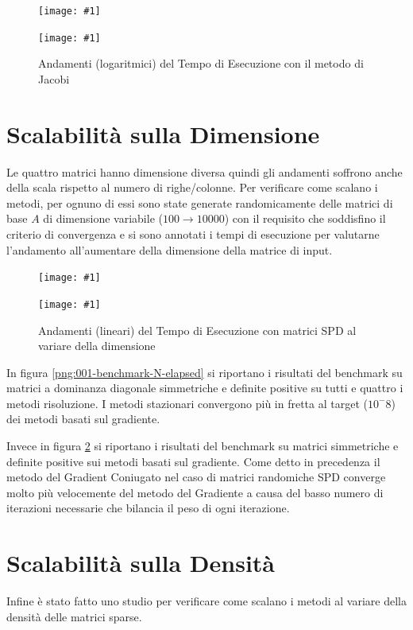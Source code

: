 \documentclass[a4paper,11pt,oneside, table]{article}
\newcommand{\putsubimage}[5] {
  \begin{minipage}{{#4}\linewidth}
	    \centering
      \texttt{[image: \#1]}
	    \caption{#2}\label{#3}
	\end{minipage}
}
\newcommand{\putimagecouple}[2] {
  \begin{figure}[!htb]
      \centering
      #1
      \hspace{0.5cm}
      #2
  \end{figure}
}
\begin{document}
\putimagecouple
  {\putsubimage{./images/te-re-gse.png}{Andamenti (logaritmici) del Tempo di Esecuzione con il metodo di Gauss Seidel}{png:te-re-gse}{0.4}{0.99}}
  {\putsubimage{./images/te-re-jae.png}{Andamenti (logaritmici) del Tempo di Esecuzione con il metodo di Jacobi}{png:te-re-jae}{0.4}{0.99}}

\section{Scalabilit\`a sulla Dimensione}

Le quattro matrici hanno dimensione diversa quindi gli andamenti soffrono anche della scala rispetto al numero di righe/colonne. Per verificare come scalano i metodi, per ognuno di essi sono state generate randomicamente delle matrici di base $A$ di dimensione variabile ($100 \rightarrow 10000$) con il requisito che soddisfino il criterio di convergenza e si sono annotati i tempi di esecuzione per valutarne l'andamento all'aumentare della dimensione della matrice di input.

\putimagecouple
  {\putsubimage{./images/001-benchmark-N-elapsed.png}{Andamenti (lineari) del Tempo di Esecuzione con matrici RDD al variare della dimensione}{png:001-benchmark-N-elapsed}{0.4}{0.99}}
  {\putsubimage{./images/002-benchmark-N-elapsed.png}{Andamenti (lineari) del Tempo di Esecuzione con matrici SPD al variare della dimensione}{png:002-benchmark-N-elapsed}{0.4}{0.99}}

In figura \ref{png:001-benchmark-N-elapsed} si riportano i risultati del benchmark su matrici a dominanza diagonale simmetriche e definite positive su tutti e quattro i metodi risoluzione.
I metodi stazionari convergono pi\`u in fretta al target ($10^-8$) dei metodi basati sul gradiente.

Invece in figura \ref{png:002-benchmark-N-elapsed} si riportano i risultati del benchmark su matrici simmetriche e definite positive sui metodi basati sul gradiente.
Come detto in precedenza il metodo del Gradient Coniugato nel caso di matrici randomiche SPD converge molto pi\`u velocemente del metodo del Gradiente a causa del basso numero di iterazioni necessarie che bilancia il peso di ogni iterazione.

\section{Scalabilit\`a sulla Densit\`a}

Infine \`e stato fatto uno studio per verificare come scalano i metodi al variare della densit\`a delle matrici sparse.
\end{document}
